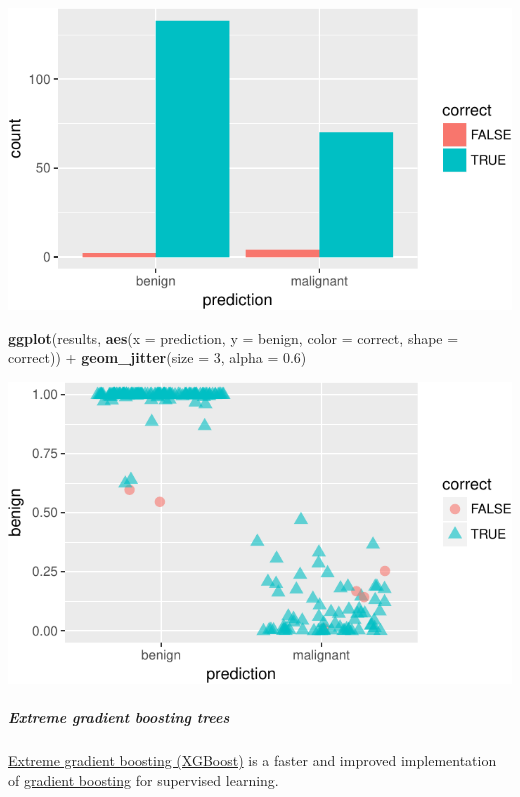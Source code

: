 \documentclass[]{article}
\newenvironment{Shaded}{\begin{snugshade}}{\end{snugshade}}
\newcommand{\KeywordTok}[1]{\textcolor[rgb]{0.13,0.29,0.53}{\textbf{{#1}}}}
\newcommand{\DataTypeTok}[1]{\textcolor[rgb]{0.13,0.29,0.53}{{#1}}}
\newcommand{\DecValTok}[1]{\textcolor[rgb]{0.00,0.00,0.81}{{#1}}}
\newcommand{\FloatTok}[1]{\textcolor[rgb]{0.00,0.00,0.81}{{#1}}}
\newcommand{\StringTok}[1]{\textcolor[rgb]{0.31,0.60,0.02}{{#1}}}
\newcommand{\NormalTok}[1]{{#1}}
\let\oldsubparagraph\subparagraph
\renewcommand{\subparagraph}[1]{\oldsubparagraph{#1}\mbox{}}
\begin{document}
\includegraphics{webinar_code_files/figure-latex/results_bar_rf-1.pdf}

\begin{Shaded}
\begin{Highlighting}[]
\KeywordTok{ggplot}\NormalTok{(results, }\KeywordTok{aes}\NormalTok{(}\DataTypeTok{x =} \NormalTok{prediction, }\DataTypeTok{y =} \NormalTok{benign, }\DataTypeTok{color =} \NormalTok{correct, }\DataTypeTok{shape =} \NormalTok{correct)) +}
\StringTok{  }\KeywordTok{geom_jitter}\NormalTok{(}\DataTypeTok{size =} \DecValTok{3}\NormalTok{, }\DataTypeTok{alpha =} \FloatTok{0.6}\NormalTok{)}
\end{Highlighting}
\end{Shaded}

\includegraphics{webinar_code_files/figure-latex/results_jitter_rf-1.pdf}

\subparagraph{Extreme gradient boosting
trees}\label{extreme-gradient-boosting-trees}

\href{http://xgboost.readthedocs.io/en/latest/model.html}{Extreme
gradient boosting (XGBoost)} is a faster and improved implementation of
\href{https://en.wikipedia.org/wiki/Gradient_boosting}{gradient
boosting} for supervised learning.
\end{document}
